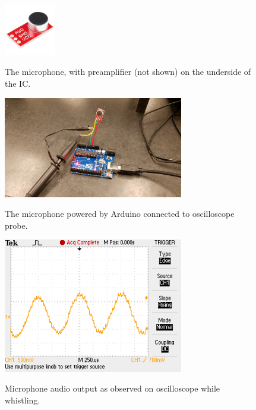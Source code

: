 \documentclass[12pt]{article}
\begin{document}
\begin{figure}[htbp]
\begin{center}
{\includegraphics[width=0.20\textwidth]{figs/mic.jpg}}
\end{center}
\caption{\label{fig:mic} The microphone, with preamplifier (not shown) on the underside of the IC.}
\end{figure}

\begin{figure}[htbp]
\begin{center}
{\includegraphics[width=0.70\textwidth]{figs/mic_ard.jpg}}
\end{center}
\caption{\label{fig:micard} The microphone powered by Arduino connected to oscilloscope probe.}
\end{figure}

\begin{figure}[htbp]
\begin{center}
{\includegraphics[width=0.70\textwidth]{figs/whistle_scope.png}}
\end{center}
\caption{\label{fig:whistlescope} Microphone audio output as observed on oscilloscope while whistling.}
\end{figure}
\end{document}
